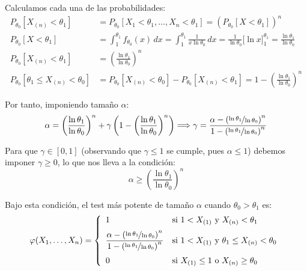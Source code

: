 \begin{ejercicio}
\begin{description}
\begin{description}
            Calculamos cada una de las probabilidades:
            \begin{align*}
                P_{\theta_0}[X_{(n)} < \theta_1] &= P_{\theta_0}[X_1 < \theta_1, \ldots, X_n < \theta_1] = \left(P_{\theta_0}[X < \theta_1]\right)^n \\
                P_{\theta_0}[X < \theta_1] &= \int_{1}^{\theta_1} f_{\theta_0}(x)\,dx = \int_{1}^{\theta_1} \frac{1}{x \ln \theta_0}\,dx = \frac{1}{\ln \theta_0}\Big[\ln x\Big]_{1}^{\theta_1} = \frac{\ln \theta_1}{\ln \theta_0} \\
                P_{\theta_0}[X_{(n)} < \theta_1] &= \left(\frac{\ln \theta_1}{\ln \theta_0}\right)^n \\
                P_{\theta_0}[\theta_1 \leq X_{(n)} < \theta_0] &= P_{\theta_0}[X_{(n)} < \theta_0] - P_{\theta_0}[X_{(n)} < \theta_1] = 1 - \left(\frac{\ln \theta_1}{\ln \theta_0}\right)^n
            \end{align*}

            Por tanto, imponiendo tamaño $\alpha$:
            \begin{equation*}
                \alpha = \left(\frac{\ln \theta_1}{\ln \theta_0}\right)^n + \gamma \left(1 - \left(\frac{\ln \theta_1}{\ln \theta_0}\right)^n\right) \Longrightarrow \gamma = \frac{\alpha - \left(\nicefrac{\ln \theta_1}{\ln \theta_0}\right)^n}{1 - \left(\nicefrac{\ln \theta_1}{\ln \theta_0}\right)^n}
            \end{equation*}

            Para que $\gamma \in [0,1]$ (observando que $\gamma \leq 1$ se cumple, pues $\alpha \leq 1$) debemos imponer $\gamma \geq 0$, lo que nos lleva a la condición:
            \begin{equation*}
                \alpha \geq \left(\frac{\ln \theta_1}{\ln \theta_0}\right)^n
            \end{equation*}

            Bajo esta condición, el test más potente de tamaño $\alpha$ cuando $\theta_0 > \theta_1$ es:
            \begin{equation*}
                \varphi(X_1, \ldots, X_n) = \left\{\begin{array}{ll}
                    1 & \text{si\ } 1 < X_{(1)} \text{\ y\ } X_{(n)} < \theta_1 \\[6pt]
                    \dfrac{\alpha - \left(\nicefrac{\ln \theta_1}{\ln \theta_0}\right)^n}{1 - \left(\nicefrac{\ln \theta_1}{\ln \theta_0}\right)^n} & \text{si\ } 1 < X_{(1)} \text{\ y\ } \theta_1 \leq X_{(n)} < \theta_0 \\[12pt]
                    0 & \text{si\ } X_{(1)} \leq 1 \text{\ o\ } X_{(n)} \geq \theta_0
                \end{array}\right.
            \end{equation*}


\end{description}
\end{description}
\end{ejercicio}
